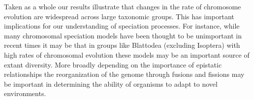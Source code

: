 Taken as a whole our results illustrate that changes in the rate of chromosome evolution are widespread across large taxonomic groups.
This has important implications for our understanding of speciation processes.
For instance, while many chromosomal speciation models \citep{baker1986, white} have been thought to be unimportant in recent times it may be that in groups like Blattodea (excluding Isoptera) with high rates of chromosomal evolution these models may be an important source of extant diversity.
More broadly depending on the importance of epistatic relationships the reorganization of the genome through fusions and fissions may be important in determining the ability of organisms to adapt to novel environments.

